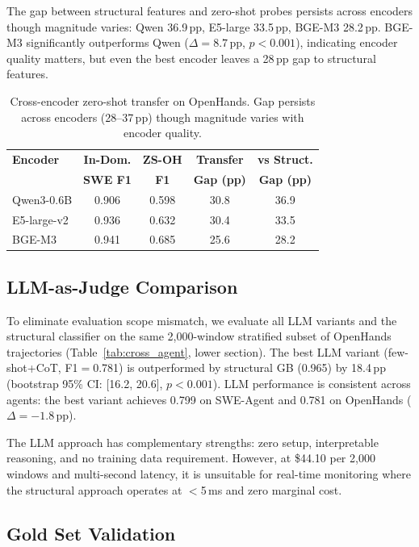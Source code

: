 \documentclass[11pt,a4paper]{article}
\begin{document}
The gap between structural features and zero-shot probes persists across encoders though magnitude varies: Qwen 36.9\,pp, E5-large 33.5\,pp, BGE-M3 28.2\,pp. BGE-M3 significantly outperforms Qwen ($\Delta{=}8.7$\,pp, $p{<}0.001$), indicating encoder quality matters, but even the best encoder leaves a 28\,pp gap to structural features.

\begin{table}[t]
\centering
\small
\begin{tabular}{lcccc}
\toprule
\textbf{Encoder} & \textbf{In-Dom.} & \textbf{ZS-OH} & \textbf{Transfer} & \textbf{vs Struct.} \\
 & \textbf{SWE F1} & \textbf{F1} & \textbf{Gap (pp)} & \textbf{Gap (pp)} \\
\midrule
Qwen3-0.6B & 0.906 & 0.598 & 30.8 & 36.9 \\
E5-large-v2 & 0.936 & 0.632 & 30.4 & 33.5 \\
BGE-M3 & 0.941 & 0.685 & 25.6 & 28.2 \\
\bottomrule
\end{tabular}
\caption{Cross-encoder zero-shot transfer on OpenHands. Gap persists across encoders (28--37\,pp) though magnitude varies with encoder quality.}
\label{tab:cross_encoder}
\end{table}

\subsection{LLM-as-Judge Comparison}

To eliminate evaluation scope mismatch, we evaluate all LLM variants and the structural classifier on the same 2,000-window stratified subset of OpenHands trajectories (Table~\ref{tab:cross_agent}, lower section).
The best LLM variant (few-shot+CoT, F1${=}$0.781) is outperformed by structural GB (0.965) by 18.4\,pp (bootstrap 95\% CI: [16.2, 20.6], $p{<}0.001$).
LLM performance is consistent across agents: the best variant achieves 0.799 on SWE-Agent and 0.781 on OpenHands ($\Delta{=}{-}1.8$\,pp).

The LLM approach has complementary strengths: zero setup, interpretable reasoning, and no training data requirement.
However, at \$44.10 per 2,000 windows and multi-second latency, it is unsuitable for real-time monitoring where the structural approach operates at $<$5\,ms and zero marginal cost.

\subsection{Gold Set Validation}
\end{document}
